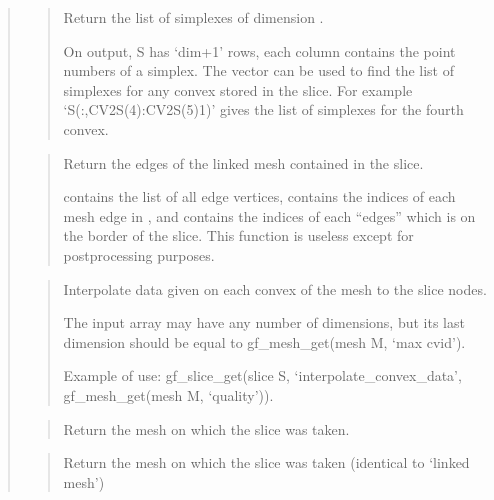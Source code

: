 \documentclass[a4paper,11pt,english]{sphinxmanual}
\begin{document}
\begin{quote}
\begin{quote}
Return the list of simplexes of dimension .

On output, S has ‘dim+1’ rows, each column contains the point
numbers of a simplex.  The vector  can be used to find the
list of simplexes for any convex stored in the slice. For example
‘S(:,CV2S(4):CV2S(5)\sphinxhyphen{}1)’
gives the list of simplexes for the fourth convex.
\end{quote}

\begin{quote}

Return the edges of the linked mesh contained in the slice.

 contains the list of all edge vertices,  contains
the indices of each mesh edge in , and  contains the
indices of each “edges” which is on the border of the slice.
This function is useless except for post\sphinxhyphen{}processing purposes.
\end{quote}

\begin{quote}

Interpolate data given on each convex of the mesh to the slice nodes.

The input array  may have any number of dimensions, but its
last dimension should be equal to gf\_mesh\_get(mesh M, ‘max cvid’).

Example of use: gf\_slice\_get(slice S, ‘interpolate\_convex\_data’, gf\_mesh\_get(mesh M, ‘quality’)).
\end{quote}

\begin{quote}

Return the mesh on which the slice was taken.
\end{quote}

\begin{quote}

Return the mesh on which the slice was taken
(identical to ‘linked mesh’)
\end{quote}


\end{quote}
\end{document}
